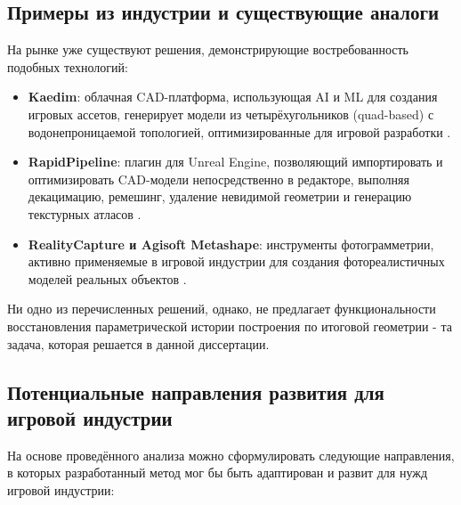 \subsection{Примеры из индустрии и существующие аналоги}

На рынке уже существуют решения, демонстрирующие востребованность подобных технологий:

\begin{itemize}
    \item \textbf{Kaedim}: облачная CAD-платформа, использующая AI и ML для создания игровых ассетов, генерирует модели из четырёхугольников (quad-based) с водонепроницаемой топологией, оптимизированные для игровой разработки \cite{kaedim}.
    \item \textbf{RapidPipeline}: плагин для Unreal Engine, позволяющий импортировать и оптимизировать CAD-модели непосредственно в редакторе, выполняя декацимацию, ремешинг, удаление невидимой геометрии и генерацию текстурных атласов \cite{rapidPipeline}.
    \item \textbf{RealityCapture и Agisoft Metashape}: инструменты фотограмметрии, активно применяемые в игровой индустрии для создания фотореалистичных моделей реальных объектов \cite{ieeePhotogrammetry}.
\end{itemize}

Ни одно из перечисленных решений, однако, не предлагает функциональности восстановления параметрической истории построения по итоговой геометрии - та задача, которая решается в данной диссертации.

\subsection{Потенциальные направления развития для игровой индустрии}

На основе проведённого анализа можно сформулировать следующие направления, в которых разработанный метод мог бы быть адаптирован и развит для нужд игровой индустрии:

